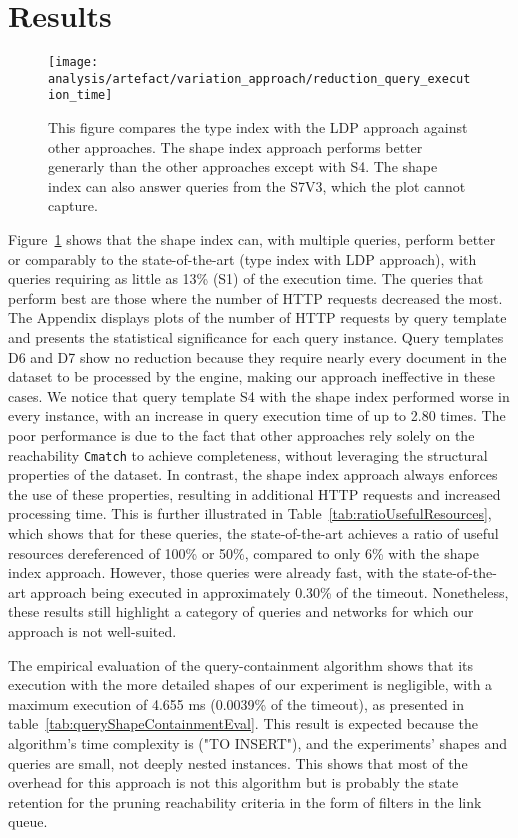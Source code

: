 \section{Results}

\begin{figure}[h]
    \centering
    \texttt{[image: analysis/artefact/variation\_approach/reduction\_query\_execution\_time]}
    \caption{
        This figure compares the type index with the LDP approach against other approaches.
        The shape index approach performs better generarly than the other approaches except with S4.
        The shape index can also answer queries from the S7V3, which the plot cannot capture.
    }
    \label{fig:compApproach}
\end{figure}


Figure~\ref{fig:compApproach} shows that the shape index can, with multiple queries, perform better or comparably to the state-of-the-art (type index with LDP approach), with queries requiring as little as 13\% (S1) of the execution time.
The queries that perform best are those where the number of HTTP requests decreased the most.
The Appendix displays plots of the number of HTTP requests by query template and presents the statistical significance for each query instance.
Query templates D6 and D7 show no reduction because they require nearly every document in the dataset to be processed by the engine, making our approach ineffective in these cases.
We notice that query template S4 with the shape index performed worse in every instance, with an increase in query execution time of up to 2.80 times.
The poor performance is due to the fact that other approaches rely solely on the reachability \texttt{Cmatch} to achieve completeness, without leveraging the structural properties of the dataset. 
In contrast, the shape index approach always enforces the use of these properties, resulting in additional HTTP requests and increased processing time.
This is further illustrated in Table~\ref{tab:ratioUsefulResources}, which shows that for these queries, the state-of-the-art achieves a ratio of useful resources dereferenced of 100\% or 50\%, compared to only 6\% with the shape index approach.
However, those queries were already fast, with the state-of-the-art approach being executed in approximately 0.30\% of the timeout.
Nonetheless, these results still highlight a category of queries and networks for which our approach is not well-suited.

The empirical evaluation of the query-containment algorithm shows that its execution with the more detailed shapes of our experiment is negligible, with a maximum execution of 4.655 ms (0.0039\% of the timeout), as presented in table~\ref{tab:queryShapeContainmentEval}.
This result is expected because the algorithm's time complexity is ("TO INSERT"), and the experiments' shapes and queries are small, not deeply nested instances.
This shows that most of the overhead for this approach is not this algorithm but is probably the state retention for the pruning reachability criteria in the form of filters in the link queue.

